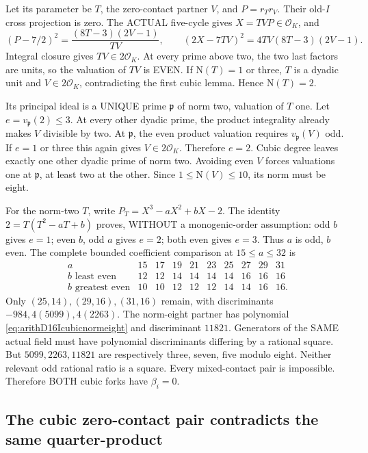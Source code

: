 \documentclass[11pt]{article}
\begin{document}
Let its parameter be \(T\), the
zero-contact partner \(V\), and
\(P=r_Tr_V\).
Their old-\(I\) cross projection is
zero.
The ACTUAL five-cycle gives
\(X=TVP\in\mathcal O_K\), and
\[
 (P-7/2)^2={\frac{(8T-3)(2V-1)}{TV}},\qquad
                      (2X-7TV)^2=4TV(8T-3)(2V-1).
\]
Integral closure gives \(TV\in2\mathcal O_K\).
At every prime above two, the two last
factors are units, so the valuation
of \(TV\) is EVEN.
If \(\mathrm N(T)=1\) or three,
\(T\) is a dyadic unit and
\(V\in2\mathcal O_K\), contradicting
the first cubic lemma.
Hence \(\mathrm N(T)=2\).

Its principal ideal is a UNIQUE prime
\(\mathfrak p\) of norm two, valuation
of \(T\) one.
Let \(e=v_{\mathfrak p}(2)\le3\).
At every other dyadic prime,
the product integrality already makes
\(V\) divisible by two.
At \(\mathfrak p\), the even product
valuation requires \(v_{\mathfrak p}(V)\)
odd.
If \(e=1\) or three this again gives
\(V\in2\mathcal O_K\).
Therefore \(e=2\).
Cubic degree leaves exactly one other
dyadic prime of norm two.
Avoiding even \(V\) forces valuations
one at \(\mathfrak p\), at least two
at the other.
Since \(1\le\mathrm N(V)\le10\),
its norm must be eight.

For the norm-two \(T\), write
\(P_T=X^3-aX^2+bX-2\).
The identity
\(2=T(T^2-aT+b)\) proves, WITHOUT
a monogenic-order assumption:
odd \(b\) gives \(e=1\);
even \(b\), odd \(a\) gives \(e=2\);
both even gives \(e=3\).
Thus \(a\) is odd, \(b\) even.
The complete bounded coefficient comparison
at \(15\le a\le32\) is
\[
\begin{array}{c|rrrrrrrrr}
a&15&17&19&21&23&25&27&29&31\\ \hline
b\text{ least even}&12&12&14&14&14&14&16&16&16\\
b\text{ greatest even}&10&10&12&12&12&14&14&16&16 .
\end{array}
\]
Only \((25,14),(29,16),(31,16)\)
remain, with discriminants
\(-984,4(5099),4(2263)\).
The norm-eight partner has polynomial
\eqref{eq:arithD16Icubicnormeight}
and discriminant \(11821\).
Generators of the SAME actual field
must have polynomial discriminants
differing by a rational square.
But \(5099,2263,11821\) are respectively
three, seven, five modulo eight.
Neither relevant odd rational ratio
is a square.
Every mixed-contact pair is impossible.
Therefore BOTH cubic forks have
\(\beta_i=0\).

\subsection{The cubic zero-contact pair contradicts the same quarter-product}
\label{app:arithD16Icubicfinish}
\end{document}
